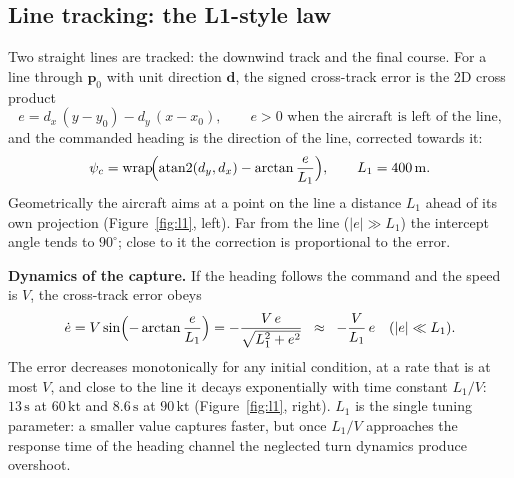 \documentclass[11pt,a4paper]{article}
\newcommand{\un}[1]{\,\mathrm{#1}}
\newcommand{\wrap}{\operatorname{wrap}}
\begin{document}
\subsection{Line tracking: the L1-style law}\label{sec:l1}

Two straight lines are tracked: the downwind track and the final course. For a
line through $\mathbf p_0$ with unit direction $\mathbf d$, the signed
cross-track error is the 2D cross product
\begin{equation}
e = d_x\,(y-y_0) - d_y\,(x-x_0), \qquad e>0 \text{ when the aircraft is left of the line,}
\end{equation}
and the commanded heading is the direction of the line, corrected towards it:
\begin{equation}
\psi_c = \wrap\!\Bigl(\operatorname{atan2}(d_y,d_x) - \arctan\frac{e}{L_1}\Bigr),
\qquad L_1=400\un{m}. \label{eq:l1}
\end{equation}
Geometrically the aircraft aims at a point on the line a distance $L_1$ ahead
of its own projection (Figure~\ref{fig:l1}, left). Far from the line
($|e|\gg L_1$) the intercept angle tends to $90^\circ$; close to it the
correction is proportional to the error.

\textbf{Dynamics of the capture.} If the heading follows the command and the
speed is $V$, the cross-track error obeys
\begin{equation}
\dot e = V\sin\Bigl(-\arctan\frac{e}{L_1}\Bigr) = -\frac{V\,e}{\sqrt{L_1^2+e^2}}
\;\;\approx\;\; -\frac{V}{L_1}\,e \quad (|e|\ll L_1).
\end{equation}
The error decreases monotonically for any initial condition, at a rate that is
at most $V$, and close to the line it decays exponentially with time constant
$L_1/V$: $13\un{s}$ at $60\un{kt}$ and $8.6\un{s}$ at $90\un{kt}$
(Figure~\ref{fig:l1}, right). $L_1$ is the single tuning parameter: a smaller
value captures faster, but once $L_1/V$ approaches the response time of the
heading channel the neglected turn dynamics produce overshoot.
\end{document}
